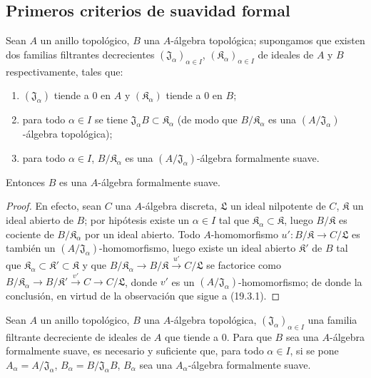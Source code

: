 \subsection{Primeros criterios de suavidad formal}
\label{subsection:0.19.4-fr}

\begin{proposition}[19.4.1]
\label{0.19.4.1-fr}
Sean $A$ un anillo topológico, $B$ una $A$-álgebra topológica; supongamos
que existen dos familias filtrantes decrecientes
$(\mathfrak J_\alpha)_{\alpha\in I}$,
$(\mathfrak K_\alpha)_{\alpha\in I}$ de ideales de $A$ y $B$
respectivamente, tales que:
\begin{enumerate}
  \item[$1^\circ$] $(\mathfrak J_\alpha)$ tiende a $0$ en $A$ y
  $(\mathfrak K_\alpha)$ tiende a $0$ en $B$;
  \item[$2^\circ$] para todo $\alpha\in I$ se tiene
  $\mathfrak J_\alpha B\subset\mathfrak K_\alpha$ (de modo que
  $B/\mathfrak K_\alpha$ es una
  $(A/\mathfrak J_\alpha)$-álgebra topológica);
  \item[$3^\circ$] para todo $\alpha\in I$,
  $B/\mathfrak K_\alpha$ es una
  $(A/\mathfrak J_\alpha)$-álgebra formalmente suave.
\end{enumerate}
Entonces $B$ es una $A$-álgebra formalmente suave.
\end{proposition}

\begin{proof}
En efecto, sean $C$ una $A$-álgebra discreta, $\mathfrak L$ un ideal
nilpotente de $C$, $\mathfrak K$ un ideal abierto de $B$; por hipótesis existe
un $\alpha\in I$ tal que
$\mathfrak K_\alpha\subset\mathfrak K$, luego $B/\mathfrak K$ es
cociente de $B/\mathfrak K_\alpha$ por un ideal abierto. Todo
$A$-homomorfismo $u':B/\mathfrak K\to C/\mathfrak L$ es también un
$(A/\mathfrak J_\alpha)$-homomorfismo, luego existe un ideal abierto
$\mathfrak K'$ de $B$ tal que
$\mathfrak K_\alpha\subset\mathfrak K'\subset\mathfrak K$ y que
$B/\mathfrak K_\alpha\to B/\mathfrak K\xrightarrow{u'}C/\mathfrak L$
se factorice como
$B/\mathfrak K_\alpha\to B/\mathfrak K'\xrightarrow{v'}C\to C/\mathfrak L$,
donde $v'$ es un
$(A/\mathfrak J_\alpha)$-homomorfismo; de donde la conclusión, en virtud de
la observación que sigue a (19.3.1).
\end{proof}

\begin{corollary}[19.4.2]
\label{0.19.4.2-fr}
Sean $A$ un anillo topológico, $B$ una $A$-álgebra topológica,
$(\mathfrak J_\alpha)_{\alpha\in I}$ una familia filtrante decreciente
de ideales de $A$ que tiende a $0$. Para que $B$ sea una $A$-álgebra
formalmente suave, es necesario y suficiente que, para todo $\alpha\in I$, si
se pone $A_\alpha=A/\mathfrak J_\alpha$,
$B_\alpha=B/\mathfrak J_\alpha B$, $B_\alpha$ sea una
$A_\alpha$-álgebra formalmente suave.
\end{corollary}

